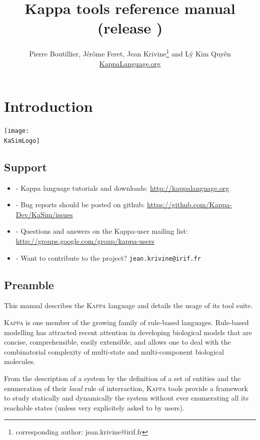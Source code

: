 \documentclass[11pt]{book}
\title{Kappa tools reference manual\\ \small (release \version)}
\author{Pierre Boutillier, J\'er\^ome Feret, Jean Krivine\thanks{corresponding author: jean.krivine@irif.fr} and L\'y Kim Quy\^en \\\href{http://www.kappalanguage.org}{KappaLanguage.org}}
\date{}
\def\KaSimLogo{img/KaSim-Logo.pdf}
\def\Kappa{\textsc{Kappa}}
\def\ttt#1{\texttt{#1}}
\def\ITE#1{\begin{itemize}#1\end{itemize}}
\begin{document}
\maketitle


\tableofcontents
\listoftables

\chapter{Introduction}
\begin{center}\texttt{[image: \\KaSimLogo]}\end{center}

\section{Support}
\ITE{
\item[-] Kappa language tutorials and downloads: \url{http://kappalanguage.org}
\item[-] Bug reports should be posted on github: \url{https://github.com/Kappa-Dev/KaSim/issues}
\item[-] Questions and answers on the Kappa-user mailing list: \url{http://groups.google.com/group/kappa-users}
\item[-] Want to contribute to the project? \ttt{jean.krivine@irif.fr}
}

\section{Preamble}
This manual describes the \Kappa{} language and details the usage of its
tool suite.

\Kappa{} is one member of the growing family of rule-based
languages. Rule-based modelling has attracted recent attention in
developing biological models that are concise, comprehensible, easily
extensible, and allows one to deal with the combinatorial complexity
of multi-state and multi-component biological molecules.

From the description of a system by the definition of a set of
entities and the enumeration of their \emph{local} rule of
interraction, \Kappa{} tools provide a framework to study statically and
dynamically the system without ever enumerating all its reachable states
(unless very explicitely asked to by users).
\end{document}
